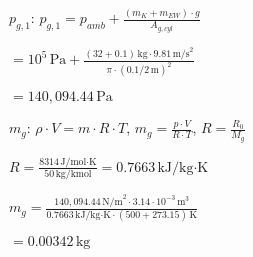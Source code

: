 \( p_{g,1} \): \( p_{g,1} = p_{amb} + \frac{(m_K + m_{EW}) \cdot g}{A_{g,cyl}} \)  

\( = 10^5 \, \text{Pa} + \frac{(32 + 0.1) \, \text{kg} \cdot 9.81 \, \text{m/s}^2}{\pi \cdot (0.1/2 \, \text{m})^2} \)  

\( = 140,094.44 \, \text{Pa} \)  

\( m_g \): \( \rho \cdot V = m \cdot R \cdot T \), \( m_g = \frac{p \cdot V}{R \cdot T} \), \( R = \frac{R_0}{M_g} \)  

\( R = \frac{8314 \, \text{J/mol·K}}{50 \, \text{kg/kmol}} = 0.7663 \, \text{kJ/kg·K} \)  

\( m_g = \frac{140,094.44 \, \text{N/m}^2 \cdot 3.14 \cdot 10^{-3} \, \text{m}^3}{0.7663 \, \text{kJ/kg·K} \cdot (500 + 273.15) \, \text{K}} \)  

\( = 0.00342 \, \text{kg} \)